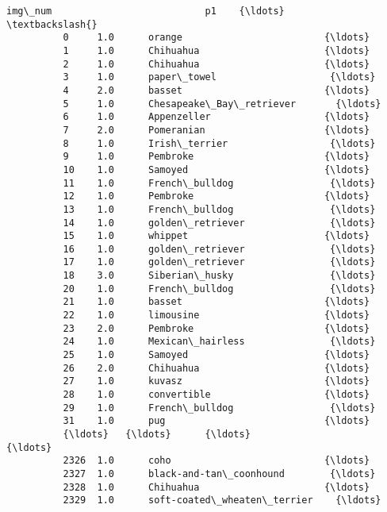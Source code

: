 \documentclass[11pt]{article}
\begin{document}
\begin{Verbatim}[commandchars=\\\{\}]
                img\_num                           p1    {\ldots}      \textbackslash{}
          0     1.0      orange                         {\ldots}       
          1     1.0      Chihuahua                      {\ldots}       
          2     1.0      Chihuahua                      {\ldots}       
          3     1.0      paper\_towel                    {\ldots}       
          4     2.0      basset                         {\ldots}       
          5     1.0      Chesapeake\_Bay\_retriever       {\ldots}       
          6     1.0      Appenzeller                    {\ldots}       
          7     2.0      Pomeranian                     {\ldots}       
          8     1.0      Irish\_terrier                  {\ldots}       
          9     1.0      Pembroke                       {\ldots}       
          10    1.0      Samoyed                        {\ldots}       
          11    1.0      French\_bulldog                 {\ldots}       
          12    1.0      Pembroke                       {\ldots}       
          13    1.0      French\_bulldog                 {\ldots}       
          14    1.0      golden\_retriever               {\ldots}       
          15    1.0      whippet                        {\ldots}       
          16    1.0      golden\_retriever               {\ldots}       
          17    1.0      golden\_retriever               {\ldots}       
          18    3.0      Siberian\_husky                 {\ldots}       
          20    1.0      French\_bulldog                 {\ldots}       
          21    1.0      basset                         {\ldots}       
          22    1.0      limousine                      {\ldots}       
          23    2.0      Pembroke                       {\ldots}       
          24    1.0      Mexican\_hairless               {\ldots}       
          25    1.0      Samoyed                        {\ldots}       
          26    2.0      Chihuahua                      {\ldots}       
          27    1.0      kuvasz                         {\ldots}       
          28    1.0      convertible                    {\ldots}       
          29    1.0      French\_bulldog                 {\ldots}       
          31    1.0      pug                            {\ldots}       
          {\ldots}   {\ldots}      {\ldots}                            {\ldots}       
          2326  1.0      coho                           {\ldots}       
          2327  1.0      black-and-tan\_coonhound        {\ldots}       
          2328  1.0      Chihuahua                      {\ldots}       
          2329  1.0      soft-coated\_wheaten\_terrier    {\ldots}       

\end{Verbatim}
\end{document}
